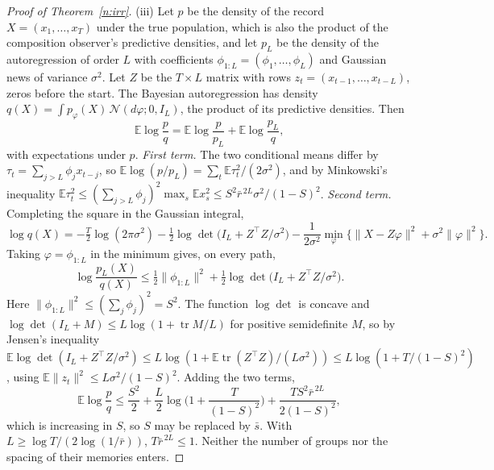 \begin{proof}[Proof of Theorem~\ref{n:irr}]
(iii) Let $p$ be the density of the record $X=(x_1,\ldots,x_T)$ under the true population, which is also the product of the composition observer's predictive densities, and let $p_L$ be the density of the autoregression of order $L$ with coefficients $\phi_{1:L}=(\phi_1,\ldots,\phi_L)$ and Gaussian news of variance $\sigma^2$. Let $Z$ be the $T\times L$ matrix with rows $z_t=(x_{t-1},\ldots,x_{t-L})$, zeros before the start. The Bayesian autoregression has density $q(X)=\int p_\varphi(X)\,\mathcal N(d\varphi;0,I_L)$, the product of its predictive densities. Then
\[
\mathbb E\log\frac pq=\mathbb E\log\frac p{p_L}+\mathbb E\log\frac{p_L}q,
\]
with expectations under $p$. \emph{First term.} The two conditional means differ by $\tau_t=\sum_{j>L}\phi_jx_{t-j}$, so $\mathbb E\log(p/p_L)=\sum_t\mathbb E\tau_t^2/(2\sigma^2)$, and by Minkowski's inequality $\mathbb E\tau_t^2\le(\sum_{j>L}\phi_j)^2\max_s\mathbb Ex_s^2\le S^2\bar r^{\,2L}\sigma^2/(1-S)^2$. \emph{Second term.} Completing the square in the Gaussian integral,
\[
\log q(X)=-\tfrac T2\log(2\pi\sigma^2)-\tfrac12\log\det\big(I_L+Z^\top Z/\sigma^2\big)-\frac1{2\sigma^2}\min_\varphi\big\{\|X-Z\varphi\|^2+\sigma^2\|\varphi\|^2\big\}.
\]
Taking $\varphi=\phi_{1:L}$ in the minimum gives, on every path,
\[
\log\frac{p_L(X)}{q(X)}\le\tfrac12\|\phi_{1:L}\|^2+\tfrac12\log\det\big(I_L+Z^\top Z/\sigma^2\big).
\]
Here $\|\phi_{1:L}\|^2\le(\sum_j\phi_j)^2=S^2$. The function $\log\det$ is concave and $\log\det(I_L+M)\le L\log(1+\operatorname{tr}M/L)$ for positive semidefinite $M$, so by Jensen's inequality $\mathbb E\log\det(I_L+Z^\top Z/\sigma^2)\le L\log(1+\mathbb E\operatorname{tr}(Z^\top Z)/(L\sigma^2))\le L\log(1+T/(1-S)^2)$, using $\mathbb E\|z_t\|^2\le L\sigma^2/(1-S)^2$. Adding the two terms,
\[
\mathbb E\log\frac pq\le\frac{S^2}2+\frac L2\log\Big(1+\frac T{(1-S)^2}\Big)+\frac{TS^2\bar r^{\,2L}}{2(1-S)^2},
\]
which is increasing in $S$, so $S$ may be replaced by $\bar s$. With $L\ge\log T/(2\log(1/\bar r))$, $T\bar r^{\,2L}\le1$. Neither the number of groups nor the spacing of their memories enters.
\end{proof}


